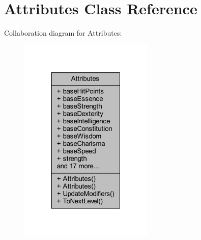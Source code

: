 \hypertarget{class_attributes}{}\section{Attributes Class Reference}
\label{class_attributes}


Collaboration diagram for Attributes\+:
\nopagebreak
\begin{figure}[H]
\begin{center}
\leavevmode
\includegraphics[width=181pt]{class_attributes__coll__graph}
\end{center}
\end{figure}
